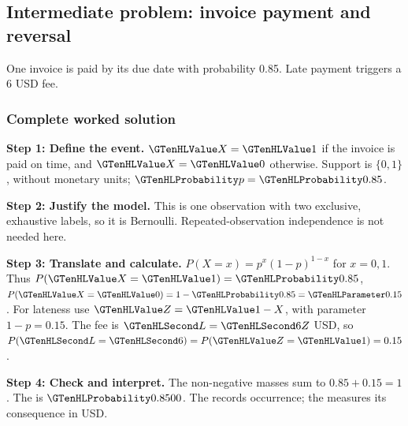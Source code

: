 \clearpage
\subsection{Intermediate problem: invoice payment and reversal}\label{prob:c3-invoice}
One invoice is paid by its due date with probability 0.85. Late payment triggers a 6 USD fee.


\subsubsection*{Complete worked solution}\label{sol:c3-invoice}
\par\noindent\begin{minipage}{\linewidth}
\textbf{Step 1: Define the event.} $\Indicator{X}=\Indicator{1}$ if the invoice is paid on time, and $\Indicator{X}=\Indicator{0}$ otherwise. Support is $\{0,1\}$, without monetary units; $\SuccessProb{p}=\SuccessProb{0.85}$.
\end{minipage}\par\medskip
\par\noindent\begin{minipage}{\linewidth}
\textbf{Step 2: Justify the model.} This is one observation with two exclusive, exhaustive labels, so it is Bernoulli. Repeated-observation independence is not needed here.
\end{minipage}\par\medskip
\par\noindent\begin{minipage}{\linewidth}
\textbf{Step 3: Translate and calculate.} $P(X=x)=p^x(1-p)^{1-x}$ for $x=0,1$. Thus $P(\Indicator{X}=\Indicator{1})=\SuccessProb{0.85}$, $P(\Indicator{X}=\Indicator{0})=1-\SuccessProb{0.85}=\FailureProb{0.15}$. For lateness use $\Indicator{Z}=\Indicator{1}-X$, with parameter $1-p=0.15$. The fee is $\Money{L}=\Money{6}Z$ USD, so $P(\Money{L}=\Money{6})=P(\Indicator{Z}=\Indicator{1})=0.15$.
\end{minipage}\par\medskip
\par\noindent\begin{minipage}{\linewidth}
\textbf{Step 4: Check and interpret.} The non-negative masses sum to $ 0.85+0.15=1$. The  is $\SuccessProb{0.8500}$. The  records occurrence; the  measures its consequence in USD.
\end{minipage}\par\medskip

